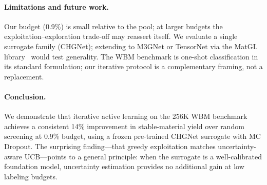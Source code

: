 \documentclass{article}
\begin{document}
\paragraph{Limitations and future work.}
Our budget (0.9\%) is small relative to the pool; at larger budgets the
exploitation--exploration trade-off may reassert itself.
We evaluate a single surrogate family (CHGNet); extending to M3GNet or TensorNet
via the MatGL library~\cite{matgl2024} would test generality.
The WBM benchmark is one-shot classification in its standard formulation;
our iterative protocol is a complementary framing, not a replacement.

\paragraph{Conclusion.}
We demonstrate that iterative active learning on the 256K WBM benchmark achieves
a consistent 14\% improvement in stable-material yield over random screening
at 0.9\% budget, using a frozen pre-trained CHGNet surrogate with MC Dropout.
The surprising finding---that greedy exploitation matches uncertainty-aware
UCB---points to a general principle: when the surrogate is a well-calibrated
foundation model, uncertainty estimation provides no additional gain at low
labeling budgets.
\end{document}
